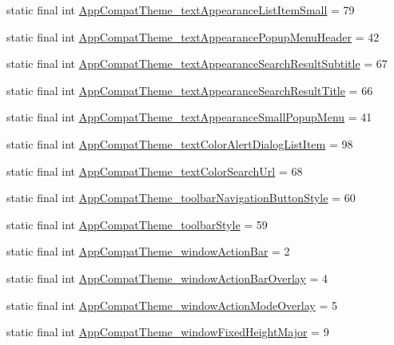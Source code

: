 \begin{CompactItemize}
\item 
static final int \hyperlink{classandroid_1_1support_1_1v4_1_1_r_1_1styleable_e4cba9e6e74a50e8866c825124a656b8}{AppCompatTheme\_\-textAppearanceListItemSmall} = 79
\item 
static final int \hyperlink{classandroid_1_1support_1_1v4_1_1_r_1_1styleable_3eaecb6b4885a61e22337bd4cace8963}{AppCompatTheme\_\-textAppearancePopupMenuHeader} = 42
\item 
static final int \hyperlink{classandroid_1_1support_1_1v4_1_1_r_1_1styleable_62807726d61e458ec15ee48dbbc82a3e}{AppCompatTheme\_\-textAppearanceSearchResultSubtitle} = 67
\item 
static final int \hyperlink{classandroid_1_1support_1_1v4_1_1_r_1_1styleable_81d84885678ba9df1805cb1815d7317c}{AppCompatTheme\_\-textAppearanceSearchResultTitle} = 66
\item 
static final int \hyperlink{classandroid_1_1support_1_1v4_1_1_r_1_1styleable_49d918bd91325c5f25bb709c1dfaf57c}{AppCompatTheme\_\-textAppearanceSmallPopupMenu} = 41
\item 
static final int \hyperlink{classandroid_1_1support_1_1v4_1_1_r_1_1styleable_6a0419e5a5e9ea88ff3f7d058fe92b7a}{AppCompatTheme\_\-textColorAlertDialogListItem} = 98
\item 
static final int \hyperlink{classandroid_1_1support_1_1v4_1_1_r_1_1styleable_a36f1ef204a6d05d312ba3e930404faa}{AppCompatTheme\_\-textColorSearchUrl} = 68
\item 
static final int \hyperlink{classandroid_1_1support_1_1v4_1_1_r_1_1styleable_87064f8d46222440c979de60d377ca13}{AppCompatTheme\_\-toolbarNavigationButtonStyle} = 60
\item 
static final int \hyperlink{classandroid_1_1support_1_1v4_1_1_r_1_1styleable_81c6c79a79be93a353a8d86869ec3c42}{AppCompatTheme\_\-toolbarStyle} = 59
\item 
static final int \hyperlink{classandroid_1_1support_1_1v4_1_1_r_1_1styleable_8831994a0d23fc63a5a2b0ebf86c8780}{AppCompatTheme\_\-windowActionBar} = 2
\item 
static final int \hyperlink{classandroid_1_1support_1_1v4_1_1_r_1_1styleable_924250499a476f5492258c6e60c451f7}{AppCompatTheme\_\-windowActionBarOverlay} = 4
\item 
static final int \hyperlink{classandroid_1_1support_1_1v4_1_1_r_1_1styleable_1edd340eee109030db65f7a0873156ea}{AppCompatTheme\_\-windowActionModeOverlay} = 5
\item 
static final int \hyperlink{classandroid_1_1support_1_1v4_1_1_r_1_1styleable_bf982bf851eb06a495f5ea786cf2972e}{AppCompatTheme\_\-windowFixedHeightMajor} = 9

\end{CompactItemize}
